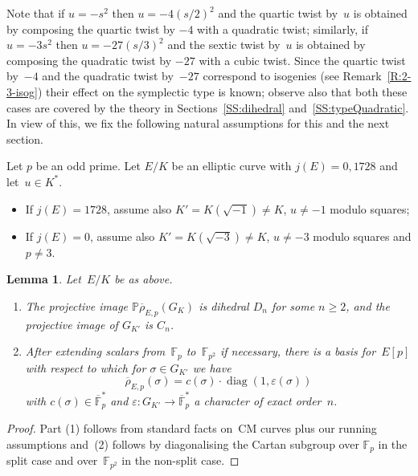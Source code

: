 \documentclass[twoside,leqno,symbols-for-thanks, draft]{rmi}
\numberwithin{equation}{section}
\newcommand{\F}{\mathbb{F}}
\newcommand{\Fp}{\mathbb{F}_p}
\newcommand{\PP}{\mathbb{P}}
\newcommand{\rhobar}{{\overline{\rho}}}
\newcommand{\eps}{\varepsilon}
\newcommand{\diag}{{\operatorname{diag}}}
\newtheorem{lemma}[theorem]{Lemma}
\theoremstyle{remark}
\begin{document}
Note that if $u = -s^2$ then $u = -4(s/2)^2$ and the quartic twist
by~$u$ is obtained by composing the quartic twist by $-4$ with a
quadratic twist; similarly, if $u = -3s^2$ then $u = -27(s/3)^2$ and
the sextic twist by~$u$ is obtained by composing the quadratic twist
by $-27$ with a cubic twist. Since the quartic twist by~$-4$ and the
quadratic twist by~$-27$ correspond to isogenies (see
Remark~\ref{R:2-3-isog}) their effect on the symplectic type is
known; observe also that both these cases are covered by the theory in
Sections~\ref{SS:dihedral} and~\ref{SS:typeQuadratic}.  In view of
this, we fix the following natural assumptions for this and the next
section.

Let $p$ be an odd prime. 
Let $E/K$ be an elliptic curve 
with $j(E) = 0, 1728$ and let~$u \in K^*$.
\begin{itemize}
 \item If $j(E) = 1728$, assume also $K'=K(\sqrt{-1}) \neq K$, 
 $u \neq -1$ modulo squares;
 \item If $j(E) = 0$, assume also $K'=K(\sqrt{-3}) \neq K$, 
 $u \neq -3$ modulo squares and
$p\not=3$. 
\end{itemize}

\begin{lemma} \label{L:diagonalC}
Let~$E/K$ be as above. 
\begin{enumerate}
  \item
The projective image $\PP\rhobar_{E,p}(G_K)$ is dihedral $D_n$ for
some $n\ge2$, and the projective image of $G_{K'}$ is $C_n$.
\item
After extending scalars from~$\Fp$ to~$\F_{p^2}$ if necessary, there
is a basis for~$E[p]$ with respect to which for $\sigma\in G_{K'}$ we
have
\begin{equation}
 \label{E:diagonalC}
\rhobar_{E,p}(\sigma) = c(\sigma)\cdot\diag(1,\eps(\sigma))
\end{equation}
with $c(\sigma)\in\overline{\F}_p^*$ and
$\eps:G_{K'}\to\overline{\F}_p^*$ a character of exact order~$n$.
\end{enumerate}
\end{lemma}
\begin{proof}
Part (1) follows from standard facts on~CM curves plus our running
assumptions and~(2) follows by diagonalising the Cartan subgroup over $\Fp$ in
  the split case and over~$\F_{p^2}$ in the non-split case.
\end{proof}
\end{document}
